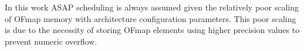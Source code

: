 In this work ASAP scheduling is always assumed given the relatively poor scaling
of OFmap memory with architecture configuration parameters. This poor scaling is due
to the necessity of storing OFmap elements using higher precision values to
prevent numeric overflow. 


